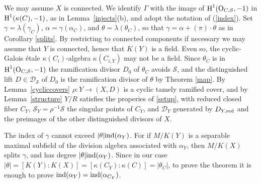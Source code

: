 \documentclass{amsart}
\theoremstyle{plain}
\theoremstyle{definition}
\theoremstyle{remark}
\numberwithin{equation}{section}%
\renewcommand{\H}{{\text{\rm H}}}
\renewcommand{\O}{{\text{\rm O}}}
\renewcommand{\S}{{\mathcal S}}
\newcommand{\df}{{\,\overset{\text{\rm df}}{=}\,}}
\newcommand{\ind}{{\text{\rm ind}}}
\newcommand{\red}{{\text{\rm red}}}
\newcommand{\Pf}{{\noindent{\it Proof.}\;\;}}
\begin{document}
\Pf
We may assume $X$ is connected.
We identify $\Gamma$ with the image of $\H^1(\O_{C,\S},-1)$ in $\H^1(\kappa(C),-1)$, 
as in Lemma~\ref{injects}(b),
and adopt the notation of (\ref{index}).
Set $\gamma=\lambda(\gamma_C)$, $\alpha=\gamma(\alpha_C)$, and $\theta=\lambda(\theta_C)$,
so that $\gamma=\alpha+(\pi)\cdot\theta$ as in Corollary \ref{splits}.
By restricting to connected components if necessary
we may assume that $Y$ is connected, hence that $K(Y)$ is a field.
Even so, the cyclic-Galois \'etale $\kappa(C_i)$-algebra $\kappa(C_{i,Y})$ may not be a field.
Since $\theta_C$ is in $\H^1(\O_{C,\S},-1)$ the ramification divisor $D_0$ of $\theta_C$ avoids $\S$,
and the distinguished lift
$D\in\mathscr D_\S$ of $D_0$ is the ramification divisor of $\theta$ by Theorem \ref{map}.
By Lemma~\ref{cycliccovers} $\rho:Y\to (X,D)$ is a cyclic tamely ramified cover,
and by Lemma~\ref{structure} $Y/R$ satisfies the properies of \eqref{setup},
with reduced closed fiber $C_Y$, $\S_Y=\rho^{-1}\S$ the singular points of $C_Y$,
and $\mathscr D_Y$ generated by $D_{Y,\red}$ and the preimages of the other distinguished
divisors of $X$.

The index of $\gamma$ cannot exceed $|\theta|\ind(\alpha_Y)$.
For if $M/K(Y)$ is a separable maximal subfield of the division algebra
associated with $\alpha_Y$, then $M/K(X)$ splits $\gamma$,
and has degree $|\theta|\ind(\alpha_Y)$.
Since in our case $|\theta|=[K(Y):K(X)]=[\kappa(C_Y):\kappa(C)]=|\theta_C|$, 
to prove the theorem it is enough
to prove $\ind(\alpha_Y)=\ind(\alpha_{C_Y})$.

\end{document}
